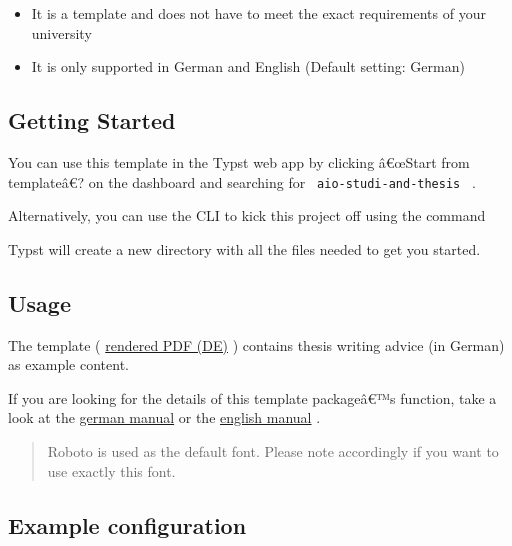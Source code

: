\begin{itemize}
\tightlist
\item
  It is a template and does not have to meet the exact requirements of
  your university
\item
  It is only supported in German and English (Default setting: German)
\end{itemize}

\subsection{Getting Started}\label{getting-started}

You can use this template in the Typst web app by clicking â€œStart from
templateâ€? on the dashboard and searching for
\texttt{\ aio-studi-and-thesis\ } .

Alternatively, you can use the CLI to kick this project off using the
command

\begin{Shaded}
\begin{Highlighting}[]
\end{Highlighting}
\end{Shaded}

Typst will create a new directory with all the files needed to get you
started.

\subsection{Usage}\label{usage}

The template (
\href{https://github.com/typst/packages/raw/main/packages/preview/aio-studi-and-thesis/0.1.0/docs/example-de-thesis.pdf}{rendered
PDF (DE)} ) contains thesis writing advice (in German) as example
content.

If you are looking for the details of this template packageâ€™s
function, take a look at the
\href{https://github.com/typst/packages/raw/main/packages/preview/aio-studi-and-thesis/0.1.0/docs/manual-de.pdf}{german
manual} or the
\href{https://github.com/typst/packages/raw/main/packages/preview/aio-studi-and-thesis/0.1.0/docs/manual-en.pdf}{english
manual} .

\begin{quote}
Roboto is used as the default font. Please note accordingly if you want
to use exactly this font.
\end{quote}

\subsection{Example configuration}\label{example-configuration}

